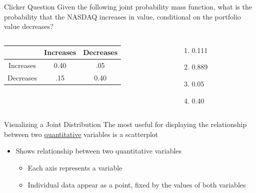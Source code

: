 \documentclass{beamer}
\begin{document}
\begin{frame}{Clicker Question}
	Given the following joint probability mass function, what is the probability that the NASDAQ increases in value, conditional on the portfolio value decreases?
	\begin{columns}
		\begin{column}{.8\textwidth}
			\begin{center}
				\begin{tabular}{ |c|c|c| }
					\hline
					\diagbox{NASDAQ}{Portfolio} & Increases & Decreases \\
					\hline
					Increases                        & 0.40      & .05       \\
					\hline
					Decreases                        & .15       & 0.40      \\
					\hline
				\end{tabular}
			\end{center}
		\end{column}

		\begin{column}{0.3\textwidth}
			\begin{enumerate}[label=(\alph*)]
				\item 0.111
				\item 0.889
				\item 0.05
				\item 0.40
			\end{enumerate}
		\end{column}
	\end{columns}
\end{frame}

\frame

\begin{frame}{Visualizing a Joint Distribution}
	The most useful 
	for displaying the relationship between two \underline{quantitative} variables is a \alert{scatterplot}
	\begin{itemize}
		\item Shows relationship between two quantitative variables
		      \begin{itemize}
		      	\item Each axis represents a variable
		      	\item Individual data appear as a point, fixed by the values of both variables
		      \end{itemize}
	\end{itemize}
\end{frame}
\end{document}
